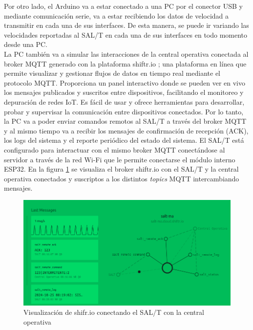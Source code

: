 Por otro lado, el Arduino va a estar conectado a una PC por el conector USB y mediante comunicación serie, va a estar recibiendo los datos de velocidad a transmitir en cada una de sus interfaces. De esta manera, se puede ir variando las velocidades reportadas al SAL/T en cada una de sus interfaces en todo momento desde una PC. \\ 


La PC también va a simular las interacciones de la central operativa conectada al broker MQTT generado con la plataforma shiftr.io \cite{shifrio}; una plataforma en línea que permite visualizar y gestionar flujos de datos en tiempo real mediante el protocolo MQTT. Proporciona un panel interactivo donde se pueden ver en vivo los mensajes publicados y suscritos entre dispositivos, facilitando el monitoreo y depuración de redes IoT. Es fácil de usar y ofrece herramientas para desarrollar, probar y supervisar la comunicación entre dispositivos conectados. Por lo tanto, la PC va a poder enviar comandos remotos al SAL/T a través del broker MQTT y al mismo tiempo va a recibir los mensajes de confirmación de recepción (ACK), los logs del sistema y el reporte periódico del estado del sistema. El SAL/T está configurado para interactuar con el mismo broker MQTT conectándose al servidor a través de la red Wi-Fi que le permite conectarse el módulo interno ESP32. En la figura \ref{fig:shiftrio}
se visualiza el broker shiftr.io con el SAL/T y la central operativa conectados y suscriptos a los distintos \textit{topics} MQTT intercambiando mensajes.



\begin{figure}[H]
    \centering
    \includegraphics[width = \linewidth]{img/shiftrio.png}
    \caption{Visualización de shifr.io conectando el SAL/T con la central operativa}
    \label{fig:shiftrio}
\end{figure}






